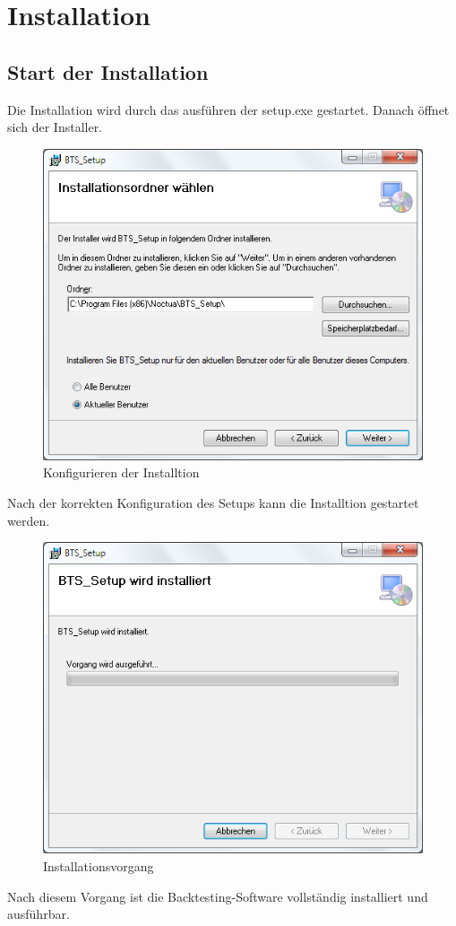 \chapter{Installation}
\section{Start der Installation}
Die Installation wird durch das ausführen der setup.exe gestartet. Danach öffnet sich der Installer.
\begin{figure}[H]
\centering
\includegraphics[width=1\textwidth]{images/btsinstall1.png}
\caption{Konfigurieren der Installtion}
\end{figure}
Nach der korrekten Konfiguration des Setups kann die Installtion gestartet werden.
\begin{figure}[H]
\centering
\includegraphics[width=1\textwidth]{images/btsinstall2.png}
\caption{Installationsvorgang}
\end{figure}
Nach diesem Vorgang ist die Backtesting-Software vollständig installiert und ausführbar.